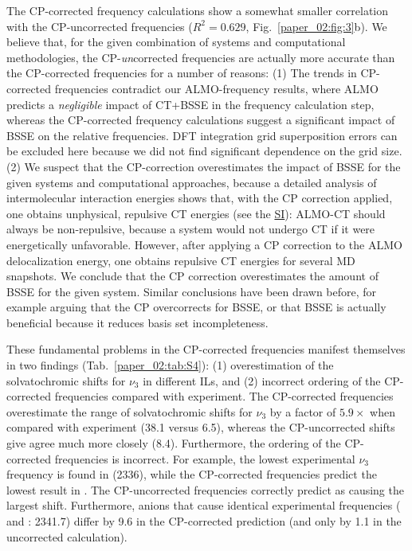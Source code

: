 The CP-corrected frequency calculations show a somewhat smaller correlation with the CP-uncorrected frequencies (\(R^2 = 0.629\), Fig.~\ref{paper_02:fig:3}b). We believe that, for the given combination of systems and computational methodologies, the CP-\emph{un}corrected frequencies are actually more accurate than the CP-corrected frequencies for a number of reasons: (1) The trends in CP-corrected frequencies contradict our ALMO-frequency results, where ALMO predicts a \emph{negligible} impact of CT+BSSE in the frequency calculation step, whereas the CP-corrected frequency calculations suggest a significant impact of BSSE on the relative frequencies. DFT integration grid superposition errors can be excluded here because we did not find significant dependence on the grid size. (2) We suspect that the CP-correction overestimates the impact of BSSE for the given systems and computational approaches, because a detailed analysis of intermolecular interaction energies shows that, with the CP correction applied, one obtains unphysical, repulsive CT energies (see the \hyperref[SI]{SI}): ALMO-CT should always be non-repulsive, because a system would not undergo CT if it were energetically unfavorable. However, after applying a CP correction to the ALMO delocalization energy, one obtains repulsive CT energies for several MD snapshots. We conclude that the CP correction overestimates the amount of BSSE for the given system. Similar conclusions have been drawn before, for example arguing\cite{Collins1986} that the CP overcorrects for BSSE, or that BSSE is actually beneficial because it reduces basis set incompleteness.\cite{Mentel2014}

These fundamental problems in the CP-corrected frequencies manifest themselves in two findings (Tab.~\ref{paper_02:tab:S4}): (1) overestimation of the solvatochromic shifts for \(\nu_{3}\) in different ILs, and (2) incorrect ordering of the CP-corrected frequencies compared with experiment. The CP-corrected frequencies overestimate the range of solvatochromic shifts for \(\nu_{3}\) by a factor of \(5.9 \times\) when compared with experiment (\SI{38.1}{\wavenumber} versus \SI{6.5}{\wavenumber}), whereas the CP-uncorrected shifts give agree much more closely (\SI{8.4}{\wavenumber}). Furthermore, the ordering of the CP-corrected frequencies is incorrect. For example, the lowest experimental \(\nu_{3}\) frequency is found in \ce{[C4C1im][SCN]} (\SI{2336}{\wavenumber}), while the CP-corrected frequencies predict the lowest result in \ce{[C4C1im][DCA]}. The CP-uncorrected frequencies correctly predict \ce{[SCN]-} as causing the largest shift. Furthermore, anions that cause identical experimental frequencies (\ce{[Tf2N]-} and \ce{[BF4]-}: \SI{2341.7}{\wavenumber}) differ by \SI{9.6}{\wavenumber} in the CP-corrected prediction (and only by \SI{1.1}{\wavenumber} in the uncorrected calculation).


